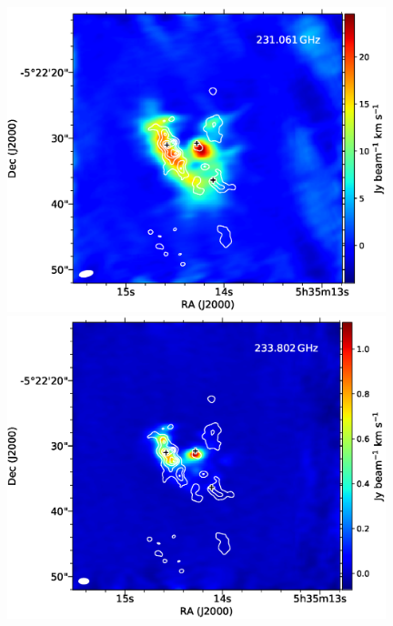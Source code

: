 \begin{figure}[H]
\begin{center}
\begin{minipage}{0.98\textwidth} 
\begin{center}
\begin{minipage}{0.48\textwidth}
\begin{center}
\includegraphics[width=0.98\textwidth]{OrionKL/mom0/231.061mom0_3-7.eps}
\end{center}
\end{minipage}
\begin{minipage}{0.48\textwidth}
\begin{center}
\includegraphics[width=0.98\textwidth]{OrionKL/mom0/233.802mom0_3-7.eps}
\end{center}
\end{minipage}
\end{center}
\end{minipage}


\end{center}
\end{figure}
